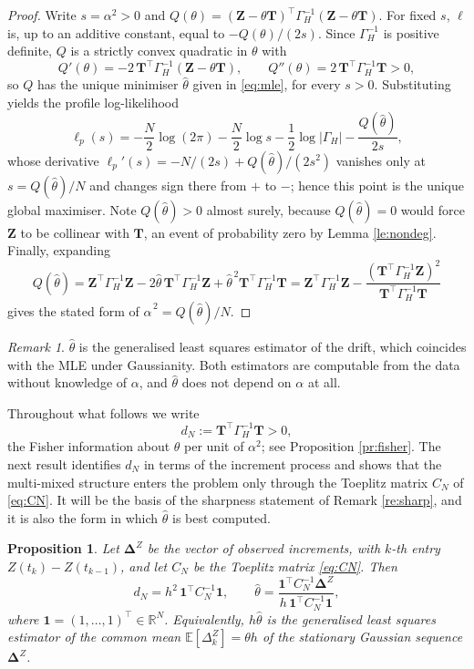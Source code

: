 \documentclass[11pt,reqno]{amsart}
\numberwithin{equation}{section}
\theoremstyle{plain}
\newtheorem{proposition}[theorem]{Proposition}
\theoremstyle{definition}
\theoremstyle{remark}
\newtheorem{remark}[theorem]{Remark}
\newcommand{\bT}{\mathbf{T}}
\newcommand{\bZ}{\mathbf{Z}}
\newcommand{\bDelta}{\boldsymbol{\Delta}}
\newcommand{\bone}{\mathbf{1}}
\newcommand{\GH}{\Gamma_H}
\newcommand{\R}{\mathbb{R}}
\newcommand{\E}{\mathbb{E}}
\begin{document}
\begin{proof}
Write $s=\alpha^{2}>0$ and $Q(\theta)=(\bZ-\theta\bT)^{\top}\GH^{-1}(\bZ-\theta\bT)$.
For fixed $s$, $\ell$ is, up to an additive constant, equal to $-Q(\theta)/(2s)$. Since
$\GH^{-1}$ is positive definite, $Q$ is a strictly convex quadratic in $\theta$ with
\[
  Q'(\theta)=-2\,\bT^{\top}\GH^{-1}(\bZ-\theta\bT),\qquad
  Q''(\theta)=2\,\bT^{\top}\GH^{-1}\bT>0,
\]
so $Q$ has the unique minimiser $\widehat\theta$ given in \eqref{eq:mle}, for every
$s>0$. Substituting yields the profile log-likelihood
\[
  \ell_p(s)=-\frac N2\log(2\pi)-\frac N2\log s-\frac12\log|\GH|
            -\frac{Q(\widehat\theta)}{2s},
\]
whose derivative $\ell_p'(s)=-N/(2s)+Q(\widehat\theta)/(2s^{2})$ vanishes only at
$s=Q(\widehat\theta)/N$ and changes sign there from $+$ to $-$; hence this point is the
unique global maximiser. Note $Q(\widehat\theta)>0$ almost surely, because
$Q(\widehat\theta)=0$ would force $\bZ$ to be collinear with $\bT$, an event of
probability zero by Lemma \ref{le:nondeg}. Finally, expanding
\[
  Q(\widehat\theta)=\bZ^{\top}\GH^{-1}\bZ-2\widehat\theta\,\bT^{\top}\GH^{-1}\bZ
  +\widehat\theta^{\,2}\bT^{\top}\GH^{-1}\bT
  =\bZ^{\top}\GH^{-1}\bZ-\frac{(\bT^{\top}\GH^{-1}\bZ)^{2}}{\bT^{\top}\GH^{-1}\bT}
\]
gives the stated form of $\widehat\alpha^{\,2}=Q(\widehat\theta)/N$.
\end{proof}

\begin{remark}\label{re:gls}
$\widehat\theta$ is the generalised least squares estimator of the drift, which coincides
with the MLE under Gaussianity. Both estimators are computable from the data without
knowledge of $\alpha$, and $\widehat\theta$ does not depend on $\alpha$ at all.
\end{remark}

Throughout what follows we write
\begin{equation}\label{eq:dN}
  d_N:=\bT^{\top}\GH^{-1}\bT>0 ,
\end{equation}
the Fisher information about $\theta$ per unit of $\alpha^{2}$; see Proposition
\ref{pr:fisher}. The next result identifies $d_N$ in terms of the increment process and
shows that the multi-mixed structure enters the problem only through the Toeplitz matrix
$C_N$ of \eqref{eq:CN}. It will be the basis of the sharpness statement of
Remark \ref{re:sharp}, and it is also the form in which $\widehat\theta$ is best
computed.

\begin{proposition}\label{pr:increment}
Let $\bDelta^{Z}$ be the vector of observed increments, with $k$-th entry
$Z(t_k)-Z(t_{k-1})$, and let $C_N$ be the Toeplitz matrix \eqref{eq:CN}. Then
\begin{equation}\label{eq:dNincr}
  d_N=h^{2}\,\bone^{\top}C_N^{-1}\bone,
  \qquad
  \widehat\theta=\frac{\bone^{\top}C_N^{-1}\bDelta^{Z}}
                      {h\,\bone^{\top}C_N^{-1}\bone},
\end{equation}
where $\bone=(1,\dots,1)^{\top}\in\R^{N}$. Equivalently, $h\widehat\theta$ is the
generalised least squares estimator of the common mean $\E[\Delta^{Z}_k]=\theta h$ of the
stationary Gaussian sequence $\bDelta^{Z}$.
\end{proposition}
\end{document}

